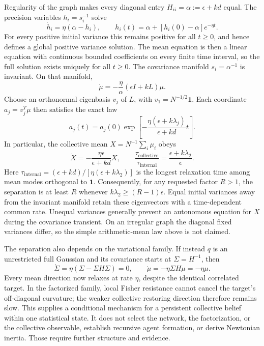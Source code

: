 Regularity of the graph makes every diagonal entry $H_{ii}=\alpha:=\epsilon+kd$ equal. The precision variables $h_i=s_i^{-1}$ solve
\begin{equation}
 \dot h_i=\eta(\alpha-h_i),\qquad
 h_i(t)=\alpha+[h_i(0)-\alpha]e^{-\eta t}.
 \label{eq:collective_memory_precision}
\end{equation}
For every positive initial variance this remains positive for all $t\geq0$, and hence defines a global positive variance solution. The mean equation is then a linear equation with continuous bounded coefficients on every finite time interval, so the full solution exists uniquely for all $t\geq0$. The covariance manifold $s_i=\alpha^{-1}$ is invariant. On that manifold,
\begin{equation}
 \dot\mu=-\frac\eta\alpha(\epsilon I+kL)\mu.
 \label{eq:collective_memory_linear}
\end{equation}
Choose an orthonormal eigenbasis $v_j$ of $L$, with $v_1=N^{-1/2}\boldsymbol1$. Each coordinate $a_j=v_j^T\mu$ then satisfies the exact law
\begin{equation}
 a_j(t)=a_j(0)\exp\left[-\frac{\eta(\epsilon+k\lambda_j)}{\epsilon+kd}t\right].
 \label{eq:collective_memory_modes}
\end{equation}
In particular, the collective mean $X=N^{-1}\sum_i\mu_i$ obeys
\begin{equation}
 \dot X=-\frac{\eta\epsilon}{\epsilon+kd}X,\qquad
 \frac{\tau_{\mathrm{collective}}}{\tau_{\mathrm{internal}}}
 =\frac{\epsilon+k\lambda_2}{\epsilon}.
 \label{eq:collective_memory_separation}
\end{equation}
Here $\tau_{\mathrm{internal}}=(\epsilon+kd)/[\eta(\epsilon+k\lambda_2)]$ is the longest relaxation time among mean modes orthogonal to $\boldsymbol1$. Consequently, for any requested factor $R>1$, the separation is at least $R$ whenever $k\lambda_2\geq(R-1)\epsilon$. Equal initial variances away from the invariant manifold retain these eigenvectors with a time-dependent common rate. Unequal variances generally prevent an autonomous equation for $X$ during the covariance transient. On an irregular graph the diagonal fixed variances differ, so the simple arithmetic-mean law above is not claimed.

The separation also depends on the variational family. If instead $q$ is an unrestricted full Gaussian and its covariance starts at $\Sigma=H^{-1}$, then
\begin{equation}
 \dot\Sigma=\eta(\Sigma-\Sigma H\Sigma)=0,\qquad
 \dot\mu=-\eta\Sigma H\mu=-\eta\mu.
 \label{eq:collective_memory_full_family}
\end{equation}
Every mean direction now relaxes at rate $\eta$, despite the identical correlated target. In the factorized family, local Fisher resistance cannot cancel the target's off-diagonal curvature; the weaker collective restoring direction therefore remains slow. This supplies a conditional mechanism for a persistent collective belief within one statistical state. It does not select the network, the factorization, or the collective observable, establish recursive agent formation, or derive Newtonian inertia. Those require further structure and evidence.


